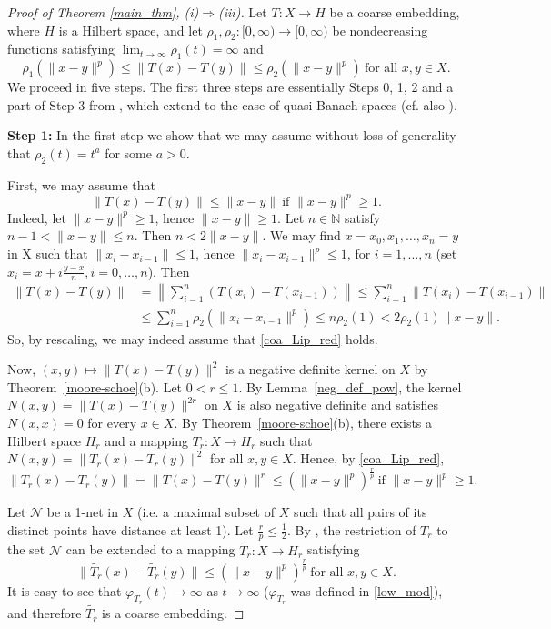 \documentclass[a4paper,oneside]{amsart}
\theoremstyle{definition}
\begin{document}
\begin{proof}[Proof of Theorem \ref{main_thm}, (i)$\Rightarrow$(iii)]
Let $T:X\to H$ be a coarse embedding, where $H$ is a Hilbert space, and let $\rho_1,\rho_2:[0,\infty)\to[0,\infty)$ be nondecreasing functions satisfying $\lim_{t\to\infty}\rho_1(t)=\infty$ and 
$$\rho_1(\|x-y\|^p)\leq\|T(x)-T(y)\|\leq\rho_2(\|x-y\|^p)\ \text{for all }x,y\in X.$$ 
We proceed in five steps. The first three steps are essentially Steps 0, 1, 2 and a part of Step 3 from \cite{jr}, which extend to the case of quasi-Banach spaces (cf. also \cite[Proposition 2]{ra}).

\textbf{Step 1:} In the first step we show that we may assume without loss of generality that $\rho_2(t)=t^a$ for some $a>0$.

First, we may assume that 
\begin{equation}\label{coa_Lip_red}
\|T(x)-T(y)\|\leq\|x-y\|\ \text{if }\|x-y\|^p\geq1.
\end{equation}
Indeed, let $\|x-y\|^p\geq1$, hence $\|x-y\|\geq1$. Let $n\in{\mathbb{N}}$ satisfy $n-1<\|x-y\|\leq n$. Then $n<2\|x-y\|$. We may find $x=x_0,x_1,\dots,x_n=y$ in X such that $\|x_i-x_{i-1}\|\leq1$, hence $\|x_i-x_{i-1}\|^p\leq1$, for $i=1,\dots,n$ (set $x_i=x+i\frac{y-x}{n},i=0,\dots,n$). Then 
\begin{align*}
\|T(x)-T(y)\|&=\left\|\sum_{i=1}^n\left(T(x_i)-T(x_{i-1})\right)\right\|\leq\sum_{i=1}^n\|T(x_i)-T(x_{i-1})\|\\
&\leq\sum_{i=1}^n\rho_2(\|x_i-x_{i-1}\|^p)\leq n\rho_2(1)<2\rho_2(1)\|x-y\|.
\end{align*}
So, by rescaling, we may indeed assume that \eqref{coa_Lip_red} holds.

Now, $(x,y)\mapsto\|T(x)-T(y)\|^2$ is a negative definite kernel on $X$ by Theorem~\ref{moore-schoe}(b). Let $0<r\leq1$. By Lemma~\ref{neg_def_pow}, the kernel $N(x,y)=\|T(x)-T(y)\|^{2r}$ on $X$ is also negative definite and satisfies $N(x,x)=0$ for every $x\in X$. By Theorem~\ref{moore-schoe}(b), there exists a Hilbert space $H_r$ and a mapping $T_r:X\to H_r$ such that $N(x,y)=\|T_r(x)-T_r(y)\|^2$ for all $x,y\in X$. Hence, by \eqref{coa_Lip_red}, $$\|T_r(x)-T_r(y)\|=\|T(x)-T(y)\|^r\leq(\|x-y\|^p)^\frac{r}{p}\ \text{if }\|x-y\|^p\geq1.$$

Let $\mathcal{N}$ be a 1-net in $X$ (i.e. a maximal subset of $X$ such that all pairs of its distinct points have distance at least 1). Let $\frac{r}{p}\leq\frac{1}{2}$. By \cite[last statement of Theorem~19.1]{ww}, the restriction of $T_r$ to the set $\mathcal{N}$ can be extended to a mapping $\widetilde{T_r}:X\to H_r$ satisfying 
$$\|\widetilde{T_r}(x)-\widetilde{T_r}(y)\|\leq(\|x-y\|^p)^\frac{r}{p}\ \text{for all }x,y\in X.$$ 
It is easy to see that $\varphi_{\widetilde{T_r}}(t)\to\infty$ as $t\to\infty$ ($\varphi_{\widetilde{T_r}}$ was defined in \eqref{low_mod}), and therefore $\widetilde{T_r}$ is a coarse embedding.


\end{proof}
\end{document}
